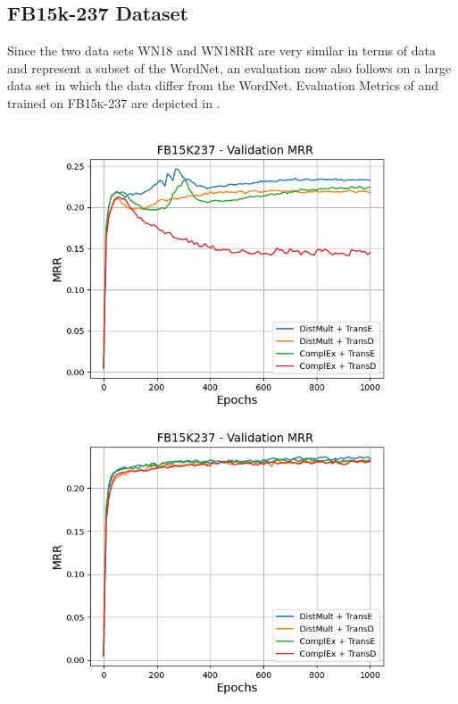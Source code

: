 \subsection{FB15k-237 Dataset}
\label{subsec:methods_fb15k237}

Since the two data sets WN18 and WN18RR are very similar in terms of data and represent a subset of the WordNet, an evaluation now also follows on a large data set in which the data differ from the WordNet.
Evaluation Metrics of \usmax and \ussoftmax trained on \textsc{FB15k-237} are depicted in .
\begin{figure}
    \centering
    \begin{minipage}{.5\textwidth}
      \centering
      \includegraphics[width=0.9\linewidth]{figures/results/gan_train/not_pretrained/uncertainty/max/entropy/fb15k237/1k_epochs/uncertainty_fb15k237_mrrs.png}
    \end{minipage}%
    \begin{minipage}{.5\textwidth}
      \centering
      \includegraphics[width=0.9\linewidth]{figures/results/gan_train/not_pretrained/uncertainty/max_distribution/entropy/fb15k237/1k_epochs/uncertainty_fb15k237_mrrs.png}

\end{minipage}
\end{figure}
